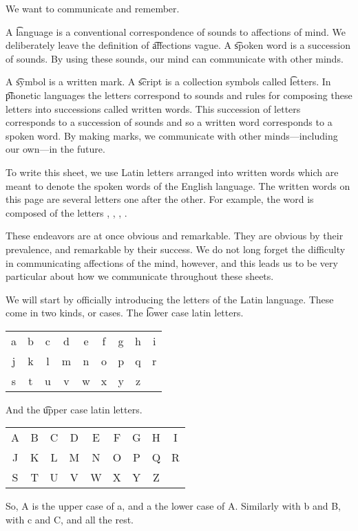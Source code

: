 

We want to communicate and remember.


A \t{language} is a conventional correspondence of sounds to affections of mind.
We deliberately leave the definition of \t{affections} vague.
A \t{spoken word} is a succession of sounds.
By using these sounds, our mind can communicate with other minds.

A \t{symbol} is a written mark.
A \t{script} is a collection symbols called \t{letters}.
In \t{phonetic} languages the letters correspond to sounds and rules for composing these letters into successions called written words.
This succession of letters corresponds to a succession of sounds and so a written word corresponds to a spoken word.
By making marks, we communicate with other minds---including our own---in the future.

To write this sheet, we use Latin letters arranged into written words which are meant to denote the spoken words of the English language.
The written words on this page are several letters one after the other.
For example, the word  is composed of the letters , , , .

These endeavors are at once obvious and remarkable.
They are obvious by their prevalence, and remarkable by their success.
We do not long forget the difficulty in communicating affections of the mind, however, and this leads us to be very particular about how we communicate throughout these sheets.


We will start by officially introducing the letters of the Latin language.
These come in two kinds, or cases.
The \t{lower case latin letters}.
\begin{center}
\begin{tabular}{ccccccccc}
  a & b & c & d & e & f & g & h & i \\
  j & k & l & m & n & o & p & q & r \\
  s & t & u & v & w & x & y & z &   \\
\end{tabular}
\end{center}
And the \t{upper case latin letters}.
\begin{center}
\begin{tabular}{ccccccccc}
  A & B & C & D & E & F & G & H & I \\
  J & K & L & M & N & O & P & Q & R \\
  S & T & U & V & W & X & Y & Z &   \\
\end{tabular}
\end{center}
So, A is the upper case of a, and a the lower case of A.
Similarly with b and B, with c and C, and all the rest.

